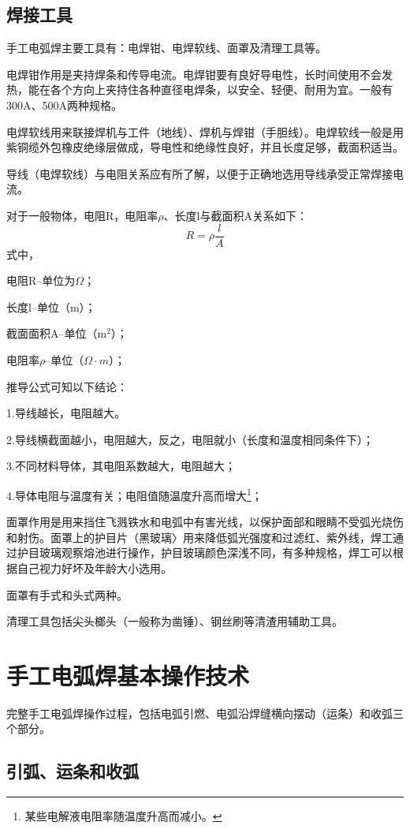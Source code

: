 \documentclass{ctexbook}
\begin{document}
\subsection{焊接工具}
手工电弧焊主要工具有：电焊钳、电焊软线、面罩及清理工具等。

电焊钳作用是夹持焊条和传导电流。电焊钳要有良好导电性，长时间使用不会发热，能在各个方向上夹持住各种直径电焊条，以安全、轻便、耐用为宜。一般有300A、500A两种规格。

电焊软线用来联接焊机与工件（地线）、焊机与焊钳（手胆线）。电焊软线一般是用紫铜缆外包橡皮绝缘层做成，导电性和绝缘性良好，并且长度足够，截面积适当。

导线（电焊软线）与电阻关系应有所了解，以便于正确地选用导线承受正常焊接电流。

对于一般物体，电阻R，电阻率$\rho$、长度l与截面积A关系如下：
\begin{equation*}
	R=\rho\frac{l}{A}
\end{equation*}
式中，

电阻R--单位为$\Omega$；

长度l--单位（m）；

截面面积A--单位（m$^2$）；

电阻率$\rho$--单位（$\Omega\cdot m$）；

推导公式可知以下结论：

1.导线越长，电阻越大。

2.导线横截面越小，电阻越大，反之，电阻就小（长度和温度相同条件下）；

3.不同材料导体，其电阻系数越大，电阻越大；

4.导体电阻与温度有关；电阻值随温度升高而增大\footnote{某些电解液电阻率随温度升高而减小。}；

面罩作用是用来挡住飞溅铁水和电弧中有害光线，以保护面部和眼睛不受弧光烧伤和射伤。面罩上的护目片（黑玻璃〉用来降低弧光强度和过滤红、紫外线，焊工通过护目玻璃观察熔池进行操作，护目玻璃颜色深浅不同，有多种规格，焊工可以根据自己视力好坏及年龄大小选用。

面罩有手式和头式两种。

清理工具包括尖头榔头（一般称为凿锤）、钢丝刷等清渣用辅助工具。
\section{手工电弧焊基本操作技术}
完整手工电弧焊操作过程，包括电弧引燃、电弧沿焊缝横向摆动（运条）和收弧三个部分。
\subsection{引弧、运条和收弧}
\end{document}
